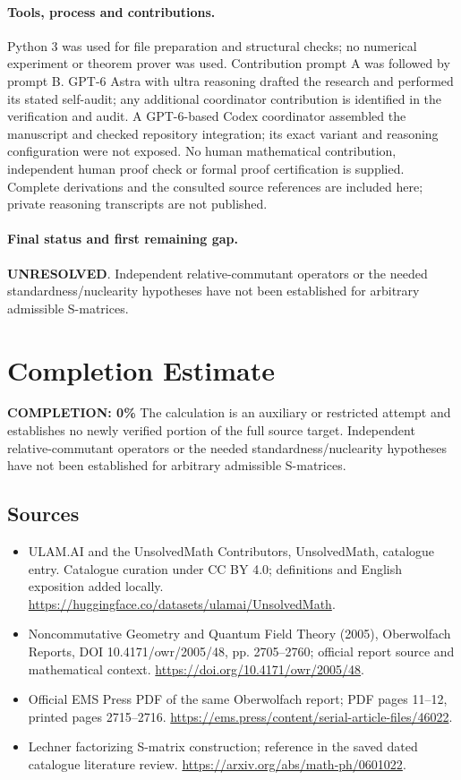 \documentclass[11pt]{article}
\begin{document}
\paragraph{Tools, process and contributions.}
Python 3 was used for file preparation and structural checks; no numerical experiment or theorem prover was used. Contribution prompt A was followed by prompt B. GPT-6 Astra with ultra reasoning drafted the research and performed its stated self-audit; any additional coordinator contribution is identified in the verification and audit. A GPT-6-based Codex coordinator assembled the manuscript and checked repository integration; its exact variant and reasoning configuration were not exposed. No human mathematical contribution, independent human proof check or formal proof certification is supplied. Complete derivations and the consulted source references are included here; private reasoning transcripts are not published.

\paragraph{Final status and first remaining gap.}
\textbf{UNRESOLVED}. Independent relative-commutant operators or the needed standardness/nuclearity hypotheses have not been established for arbitrary admissible S-matrices.

\section{Completion Estimate}
\noindent\textbf{COMPLETION: 0\%}
The calculation is an auxiliary or restricted attempt and establishes no newly verified portion of the full source target. Independent relative-commutant operators or the needed standardness/nuclearity hypotheses have not been established for arbitrary admissible S-matrices.

\subsection{Sources}
\begin{itemize}
\item[\hypertarget{source:statement:1}{S1}] ULAM.AI and the UnsolvedMath Contributors, UnsolvedMath, catalogue entry. Catalogue curation under CC BY 4.0; definitions and English exposition added locally.
\url{https://huggingface.co/datasets/ulamai/UnsolvedMath}.
\item[\hypertarget{source:statement:2}{S2}] Noncommutative Geometry and Quantum Field Theory (2005), Oberwolfach Reports, DOI 10.4171/owr/2005/48, pp. 2705--2760; official report source and mathematical context.
\url{https://doi.org/10.4171/owr/2005/48}.
\item[\hypertarget{source:statement:3}{S3}] Official EMS Press PDF of the same Oberwolfach report; PDF pages 11--12, printed pages 2715--2716.
\url{https://ems.press/content/serial-article-files/46022}.
\item[\hypertarget{source:statement:4}{S4}] Lechner factorizing S-matrix construction; reference in the saved dated catalogue literature review.
\url{https://arxiv.org/abs/math-ph/0601022}.
\end{itemize}
\label{end:statement}
\end{document}
